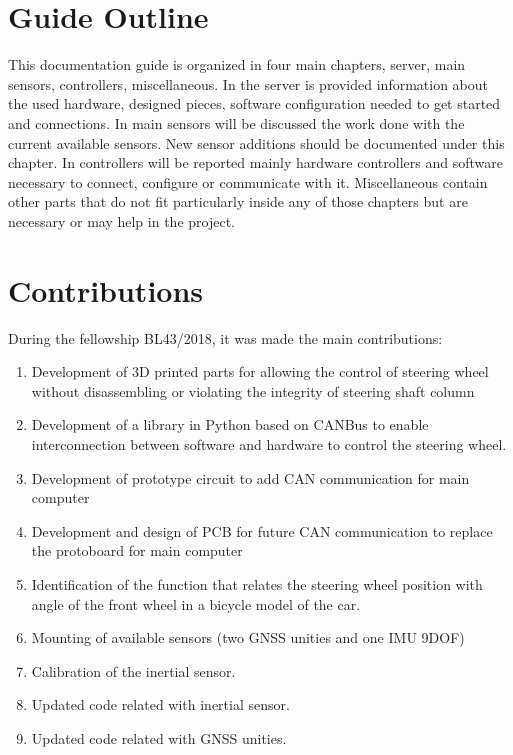 \section{Guide Outline}
\label{section:outline} 

This documentation guide is organized in four main chapters, server, main sensors, controllers, miscellaneous.
In the server is provided information about the used hardware, designed pieces, software configuration needed to get started and connections.
In main sensors will be discussed the work done with the current available sensors. New sensor additions should be documented under this chapter.
In controllers will be reported mainly hardware controllers and software necessary to connect, configure  or communicate with it.
Miscellaneous contain other parts that do not fit particularly inside any of those chapters but are necessary or may help in the project.

 

\section{Contributions}
\label{section:contributions}

During the fellowship BL43/2018, it was made the main contributions:
\begin{enumerate}
	\tightlist
	\item Development of 3D printed parts for allowing the control of steering wheel without disassembling or violating the integrity of steering shaft column
	\item Development of a library in Python based on CANBus to enable interconnection between software and hardware to control the steering wheel.
	\item Development of prototype circuit to add CAN communication for main computer
	\item Development and design of \acrshort{PCB} for future CAN communication to replace the protoboard for main computer
	\item Identification of the function that relates the steering wheel position with angle of the front wheel in a bicycle model of the car.
	\item Mounting of available sensors (two  \acrshort{GNSS} unities and one \acrshort{IMU} \acrshort{9DOF})
	\item Calibration of the inertial sensor.
	\item Updated code related with inertial sensor.
	\item Updated code related with \acrshort{GNSS} unities.
\end{enumerate}

